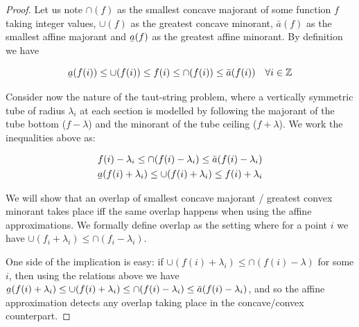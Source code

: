 \documentclass[twoside,11pt]{article}
\newcommand{\ubar}[1]{\underaccent{\bar}{#1}}
\numberwithin{equation}{section}
\numberwithin{theorem}{section}
\begin{document}
\begin{proof}
 Let us note $\cap(f)$ as the smallest concave majorant of some function $f$ taking integer values, $\cup(f)$ as the greatest concave minorant, $\bar a(f)$ as the smallest affine majorant and $\ubar a(f)$ as the greatest affine minorant. By definition we have

 \begin{equation*}
  \ubar a(f(i)) \leq \cup(f(i)) \leq f(i) \leq  \cap(f(i)) \leq \bar a(f(i)) \quad \forall i \in \mathbb{Z}
 \end{equation*}

 Consider now the nature of the taut-string problem, where a vertically symmetric tube of radius $\lambda_i$ at each section is modelled by following the majorant of the tube bottom ($f-\lambda$) and the minorant of the tube ceiling ($f+\lambda$). We work the inequalities above as:

 \begin{align*}
  f(i) - \lambda_i \leq  \cap(f(i) - \lambda_i)  \leq \bar a(f(i) - \lambda_i) \\
  \ubar a(f(i) + \lambda_i) \leq \cup(f(i) + \lambda_i) \leq f(i) + \lambda_i
 \end{align*}

 We will show that an overlap of smallest concave majorant / greatest convex minorant takes place iff the same overlap happens when using the affine approximations. We formally define overlap as the setting where for a point $i$ we have $\cup(f_i + \lambda_i) \leq \cap(f_i -\lambda_i)$.

 One side of the implication is easy: if $\cup(f(i) + \lambda_i) \leq \cap(f(i) - \lambda)$ for some $i$, then using the relations above we have $\ubar a(f(i) + \lambda_i) \leq \cup(f(i) + \lambda_i) \leq \cap(f(i) - \lambda_i) \leq \bar a(f(i) - \lambda_i)$, and so the affine approximation detects any overlap taking place in the concave/convex counterpart.


\end{proof}
\end{document}

